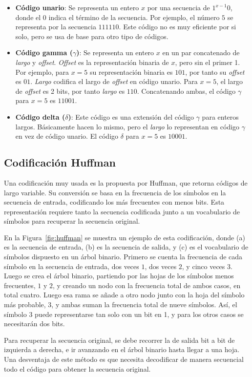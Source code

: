 \begin{itemize}
	\item \textbf{Código unario}: Se representa un entero $x$ por una secuencia de $1^{x-1}0$, donde el $0$ indica el término de la secuencia. Por ejemplo, el número $5$ se representa por la secuencia $111110$. Este código no es muy eficiente por si solo, pero se usa de base para otro tipo de códigos.
	
	\item \textbf{Código gamma ($\gamma$)}: Se representa un entero $x$ en un par concatenado de \textit{largo} y \textit{offset}. \textit{Offset} es la representación binaria de $x$, pero sin el primer 1. Por ejemplo, para $x=5$ su representación binaria es $101$, por tanto su \textit{offset} es $01$. \textit{Largo} codifica el largo de \textit{offset} en código unario. Para $x=5$, el largo de \textit{offset} es 2 bits, por tanto \textit{largo} es $110$. Concatenando ambas, el código $\gamma$ para $x=5$ es $11001$.
	
	\item \textbf{Código delta ($\delta$)}: Este código es una extensión del código $\gamma$ para enteros largos. Básicamente hacen lo mismo, pero el \textit{largo} lo representan en código $\gamma$ en vez de código unario. El código $\delta$ para $x=5$ es $10001$.
\end{itemize}

\subsection{Codificación Huffman}
Una codificación muy usada es la propuesta por Huffman\cite{huffman1952method}, que retorna códigos de largo variable. Su conversión se basa en la frecuencia de los símbolos en la secuencia de entrada, codificando los más frecuentes con menos bits. Esta representación requiere tanto la secuencia codificada junto a un vocabulario de símbolos para recuperar la secuencia original. 



En la Figura~\ref{fig:huffman} se muestra un ejemplo de esta codificación, donde (a) es la secuencia de entrada, (b) es la secuencia de salida, y (c) es el vocabulario de símbolos dispuesto en un árbol binario. Primero se cuenta la frecuencia de cada símbolo en la secuencia de entrada, dos veces $1$, dos veces $2$, y cinco veces $3$. Luego se crea el árbol binario, partiendo por las hojas de los símbolos menos frecuentes, $1$ y $2$, y creando un nodo con la frecuencia total de ambos casos, en total cuatro. Luego esa rama se añade a otro nodo junto con la hoja del símbolo más probable, $3$, y ambas suman la frecuencia total de nueve símbolos. Así, el símbolo $3$ puede representarse tan solo con un bit en 1, y para los otros casos se necesitarán dos bits.


Para recuperar la secuencia original, se debe recorrer la de salida bit a bit de izquierda a derecha, e ir avanzando en el árbol binario hasta llegar a una hoja. Una desventaja de este método es que necesita decodificar de manera secuencial todo el código para obtener la secuencia original.
